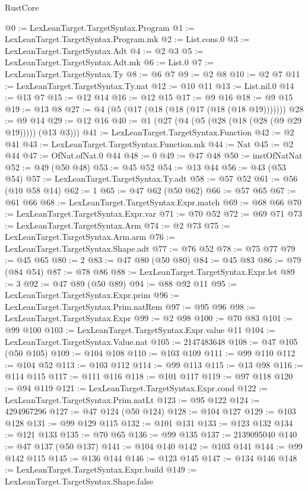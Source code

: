 \begin{lexlean}{RustCore}
\begin{coremodule}
@0 := LexLeanTarget.TargetSyntax.Program
@1 := LexLeanTarget.TargetSyntax.Program.mk
@2 := List.cons.{0}
@3 := LexLeanTarget.TargetSyntax.Adt
@4 := @2 @3
@5 := LexLeanTarget.TargetSyntax.Adt.mk
@6 := List.{0}
@7 := LexLeanTarget.TargetSyntax.Ty
@8 := @6 @7
@9 := @2 @8
@10 := @2 @7
@11 := LexLeanTarget.TargetSyntax.Ty.nat
@12 := @10 @11
@13 := List.nil.{0}
@14 := @13 @7
@15 := @12 @14
@16 := @12 @15
@17 := @9 @16
@18 := @9 @15
@19 := @13 @8
@27 := @4 (@5 (@17 (@18 (@18 (@17 (@18 (@18 @19)))))))
@28 := @9 @14
@29 := @12 @16
@40 := @1 (@27 (@4 (@5 (@28 (@18 (@28 (@9 @29 @19))))) (@13 @3)))
@41 := LexLeanTarget.TargetSyntax.Function
@42 := @2 @41
@43 := LexLeanTarget.TargetSyntax.Function.mk
@44 := Nat
@45 := @2 @44
@47 := OfNat.ofNat.{0} @44
@48 := 0
@49 := @47 @48
@50 := instOfNatNat
@52 := @49 (@50 @48)
@53 := @45 @52
@54 := @13 @44
@56 := @43 (@53 @54)
@57 := LexLeanTarget.TargetSyntax.Ty.adt
@58 := @57 @52
@61 := @56 (@10 @58 @14)
@62 := 1
@65 := @47 @62 (@50 @62)
@66 := @57 @65
@67 := @61 @66
@68 := LexLeanTarget.TargetSyntax.Expr.match
@69 := @68 @66
@70 := LexLeanTarget.TargetSyntax.Expr.var
@71 := @70 @52
@72 := @69 @71
@73 := LexLeanTarget.TargetSyntax.Arm
@74 := @2 @73
@75 := LexLeanTarget.TargetSyntax.Arm.arm
@76 := LexLeanTarget.TargetSyntax.Shape.adt
@77 := @76 @52
@78 := @75 @77
@79 := @45 @65
@80 := 2
@83 := @47 @80 (@50 @80)
@84 := @45 @83
@86 := @79 (@84 @54)
@87 := @78 @86
@88 := LexLeanTarget.TargetSyntax.Expr.let
@89 := 3
@92 := @47 @89 (@50 @89)
@94 := @88 @92 @11
@95 := LexLeanTarget.TargetSyntax.Expr.prim
@96 := LexLeanTarget.TargetSyntax.Prim.natRem
@97 := @95 @96
@98 := LexLeanTarget.TargetSyntax.Expr
@99 := @2 @98
@100 := @70 @83
@101 := @99 @100
@103 := LexLeanTarget.TargetSyntax.Expr.value @11
@104 := LexLeanTarget.TargetSyntax.Value.nat
@105 := 2147483648
@108 := @47 @105 (@50 @105)
@109 := @104 @108
@110 := @103 @109
@111 := @99 @110
@112 := @104 @52
@113 := @103 @112
@114 := @99 @113
@115 := @13 @98
@116 := @114 @115
@117 := @111 @116
@118 := @101 @117
@119 := @97 @118
@120 := @94 @119
@121 := LexLeanTarget.TargetSyntax.Expr.cond
@122 := LexLeanTarget.TargetSyntax.Prim.natLt
@123 := @95 @122
@124 := 4294967296
@127 := @47 @124 (@50 @124)
@128 := @104 @127
@129 := @103 @128
@131 := @99 @129 @115
@132 := @101 @131
@133 := @123 @132
@134 := @121 @133
@135 := @70 @65
@136 := @99 @135
@137 := 2139095040
@140 := @47 @137 (@50 @137)
@141 := @104 @140
@142 := @103 @141
@144 := @99 @142 @115
@145 := @136 @144
@146 := @123 @145
@147 := @134 @146
@148 := LexLeanTarget.TargetSyntax.Expr.build
@149 := LexLeanTarget.TargetSyntax.Shape.false

\end{coremodule}
\end{lexlean}
